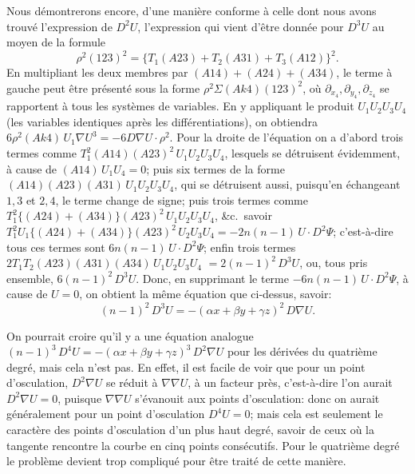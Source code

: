 \documentclass[11pt]{article}
\begin{document}
\medskip
Nous d\'emontrerons encore, d'une mani\`ere conforme \`a celle dont nous avons trouv\'e
l'expression de $D^{2} U$, l'expression qui vient d'\^etre donn\'ee pour $D^{3} U$ au moyen de la
formule
\[
\rho^{2}(123)^{2} = \{T_{1}(A 2 3) + T_{2}(A 3 1) + T_{3}(A 1 2)\}^{2}.
\]
En multipliant les deux membres par $(A 1 4) + (A 2 4) + (A 3 4)$, le terme \`a gauche peut
\^etre pr\'esent\'e sous la forme $\rho^{2}\Sigma(A k 4)(123)^{2}$, o\`u $\partial_{x_{4}}, \partial_{y_{4}}, \partial_{z_{4}}$ se rapportent \`a tous les
syst\`emes de variables. En y appliquant le produit $U_{1} U_{2} U_{3} U_{4}$ (les variables identiques
apr\`es les diff\'erentiations), on obtiendra $6 \rho^{2}(A k 4)\,U_{1}\nabla U^{3} = -6 D\nabla U \cdot \rho^{2}$. Pour la droite
de l'\'equation on a d'abord trois termes comme $T_{1}^{2}(A 1 4)(A 2 3)^{2}\,U_{1} U_{2} U_{3} U_{4}$, lesquels se
d\'etruisent \'evidemment, \`a cause de $(A 1 4)\,U_{1} U_{4} = 0$; puis six termes de la forme
$(A 1 4)(A 2 3)(A 3 1)\,U_{1} U_{2} U_{3} U_{4}$, qui se d\'etruisent aussi, puisqu'en \'echangeant $1, 3$ et $2, 4$, le
terme change de signe; puis trois termes comme $T_{1}^{2}\{(A 2 4) + (A 3 4)\}(A 2 3)^{2}\,U_{1} U_{2} U_{3} U_{4}$,
\&c.\ savoir $T_{1}^{2} U_{1}\{(A 2 4) + (A 3 4)\}(A 2 3)^{2}\,U_{2} U_{3} U_{4} = -2 n(n - 1)\,U \cdot D^{2}\Psi$; c'est-\`a-dire tous
ces termes sont $6 n(n - 1)\,U \cdot D^{2}\Psi$; enfin trois termes $2 T_{1} T_{2}(A 2 3)(A 3 1)(A 3 4)\,U_{1} U_{2} U_{3} U_{4}$
$= 2(n - 1)^{2}\,D^{3} U$, ou, tous pris ensemble, $6(n - 1)^{2}\,D^{3} U$. Donc, en supprimant le terme
$-6 n(n - 1)\,U \cdot D^{2}\Psi$, \`a cause de $U = 0$, on obtient la m\^eme \'equation que ci-dessus,
savoir:
\[
(n - 1)^{2}\,D^{3} U = -(\alpha x + \beta y + \gamma z)^{2}\,D\nabla U.
\]

\medskip
On pourrait croire qu'il y a une \'equation analogue $(n - 1)^{3}\,D^{4} U = -(\alpha x + \beta y + \gamma z)^{3}\,D^{2}\nabla U$
pour les d\'eriv\'ees du quatri\`eme degr\'e, mais cela n'est pas. En effet, il est facile de voir
que pour un point d'osculation, $D^{2}\nabla U$ se r\'eduit \`a $\nabla\nabla U$, \`a un facteur pr\`es, c'est-\`a-dire
l'on aurait $D^{2}\nabla U = 0$, puisque $\nabla\nabla U$ s'\'evanouit aux points d'osculation: donc on aurait
g\'en\'eralement pour un point d'osculation $D^{4} U = 0$; mais cela est seulement le caract\`ere
des points d'osculation d'un plus haut degr\'e, savoir de ceux o\`u la tangente rencontre la
courbe en cinq points cons\'ecutifs. Pour le quatri\`eme degr\'e le probl\`eme devient trop
compliqu\'e pour \^etre trait\'e de cette mani\`ere.
\end{document}
